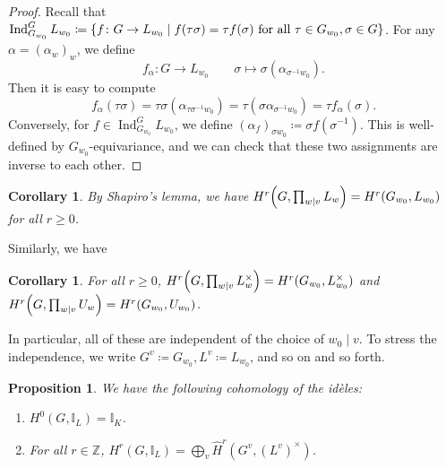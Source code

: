 \documentclass[leqno, openany]{memoir}
\newtheorem{cor}[thm]{Corollary}
\newtheorem{prop}[thm]{Proposition}
\theoremstyle{definition}
\theoremstyle{remark}
\theoremstyle{plain}
\theoremstyle{definition}
\theoremstyle{remark}
\newcommand{\Z}{\mathbb{Z}}
\newcommand{\I}{\mathbb{I}}
\newcommand{\wh}[1]{\widehat{#1}}
\DeclareMathOperator{\Ind}{Ind}
\begin{document}
\begin{proof}
    Recall that $\Ind_{G_{w_0}}^G L_{w_0} \coloneqq \qty{f \colon G \to L_{w_0} \mid f(\tau \sigma) = \tau f(\sigma)\text{ for all }\tau \in G_{w_0}, \sigma \in G}$. For any $\alpha = {(\alpha_w)}_w$, we define
    \[ f_{\alpha} \colon G \to L_{w_0} \qquad \sigma \mapsto \sigma(\alpha_{\sigma^{-1} w_0}). \]
    Then it is easy to compute
    \[ f_{\alpha}(\tau \sigma) = \tau \sigma (\alpha_{\tau \sigma^{-1} w_0}) = \tau (\sigma \alpha_{\sigma^{-1} w_0}) = \tau f_{\alpha}(\sigma). \]
    Conversely, for $f \in \Ind_{G_{w_0}}^G L_{w_0}$, we define ${(\alpha_f)}_{\sigma w_0} \coloneqq \sigma f(\sigma^{-1})$. This is well-defined by $G_{w_0}$-equivariance, and we can check that these two assignments are inverse to each other.
\end{proof}

\begin{cor}
    By Shapiro's lemma, we have $H^r\qty(G, \prod_{w \mid v} L_w) = H^r(G_{w_0}, L_{w_0})$ for all $r \geq 0$.
\end{cor}

Similarly, we have
\begin{cor}
    For all $r \geq 0$, $H^r\qty(G, \prod_{w \mid v} L_w^{\times}) = H^r(G_{w_0}, L_{w_0}^{\times})$ and $H^r\qty(G, \prod_{w \mid v} U_w) = H^r(G_{w_0}, U_{w_0})$. 
\end{cor}

In particular, all of these are independent of the choice of $w_0 \mid v$. To stress the independence, we write $G^v \coloneqq G_{w_0}, L^v \coloneqq L_{w_0}$, and so on and so forth. 

\begin{prop}\leavevmode
    We have the following cohomology of the id\`eles:
    \begin{enumerate}
        \item $H^0(G, \I_L) = \I_K$.
        \item For all $r \in \Z$, $H^r(G, \I_L) = \bigoplus_v \wh{H}^r(G^v, {(L^v)}^{\times})$.
    \end{enumerate}
\end{prop}
\end{document}
